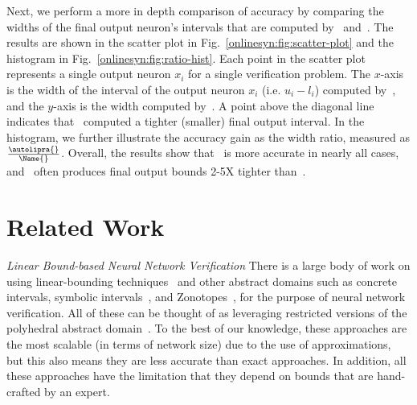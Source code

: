 
Next, we perform a more in depth comparison of accuracy by comparing the widths
of the final output neuron's intervals that are computed by~\autolipra{}
and~\Name{}. The results are shown in the scatter plot in
Fig.~\ref{onlinesyn:fig:scatter-plot} and the histogram in
Fig.~\ref{onlinesyn:fig:ratio-hist}.
Each point in the scatter plot represents a single output neuron $ x_i
$ for a single verification problem. The $ x $-axis is the width of the
interval of the output neuron $ x_i $ (i.e. $ u_i - l_i $) computed by~\Name{},
and the $ y $-axis is the width computed by~\autolipra{}. A point above the
diagonal line
indicates that~\Name{} computed a tighter (smaller) final output interval.
%
In the histogram, we further illustrate the accuracy gain as the width ratio,
measured as $ \frac{\autolipra{}}{\Name{}} $.
%
Overall, the results show that~\Name{} is more accurate in nearly all cases,
and~\Name{} often produces final output bounds 2-5X tighter than~\autolipra{}.


\section{Related Work}
\label{onlinesyn:sec:related}

\textit{Linear Bound-based Neural Network Verification}
There is a large body of work on using linear-bounding
techniques~\cite{SinghGPV19,zhang2018efficient,shi2020robustness,boopathy2019cnn,WengZCSHDBD18,paulsen2020reludiff,paulsen2020neurodiff,wu2021tightening,mohammadinejad2020diffrnn}
and other abstract domains such as concrete intervals, symbolic
intervals~\cite{WangPWYJ18}, and Zonotopes~\cite{GehrMDTCV18},
for the purpose of neural network verification.
%
All of these can be thought of as leveraging restricted versions of the
polyhedral abstract domain~\cite{CousotH78,CousotC77}.
%
To the best
of our knowledge, these approaches are the most scalable (in terms of network
size) due to the use of approximations, but this also means they are less
accurate than exact approaches. In addition, all these approaches have the
limitation that they depend on bounds that are hand-crafted by an expert.
%

